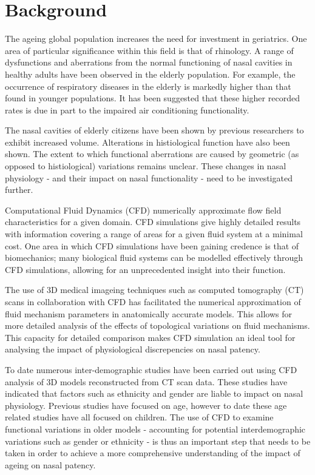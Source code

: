 \section{Background}

The ageing global population increases the need for investment in geriatrics. One area of particular significance within this field is that of rhinology. A range of dysfunctions and aberrations from the normal functioning of nasal cavities in healthy adults have been observed in the elderly population\cite{Edelstein1996, Lindemann2008}. For example, the occurrence of respiratory diseases in the elderly is markedly higher than that found in younger populations\cite{HO2001, Edelstein1996}. It has been suggested that these higher recorded rates is due in part to the impaired air conditioning functionality\cite{Lindemann2008}.


The nasal cavities of elderly citizens have been shown by previous researchers to exhibit increased volume\cite{Kalmovich2005}. Alterations in histiological function have also been shown\cite{HO2001}. The extent to which functional aberrations are caused by geometric (as opposed to histiological) variations remains unclear\cite{Varga-Huettner2013}. These changes in nasal physiology - and their impact on nasal functionality - need to be investigated further.


Computational Fluid Dynamics (CFD) numerically approximate flow field characteristics for a given domain. CFD  simulations give highly detailed results with information covering a range of areas for a given fluid system at a minimal cost. One area in which CFD simulations have been gaining credence is that of biomechanics; many biological fluid systems can be modelled effectively through CFD simulations, allowing for an unprecedented insight into their function.

The use of 3D medical imageing techniques such as computed tomography (CT) scans in collaboration with CFD has facilitated the numerical approximation of fluid mechanism parameters in anatomically accurate models. This allows for more detailed analysis of the effects of topological variations on fluid mechanisms. This capacity for detailed comparison makes CFD simulation an ideal tool for analysing the impact of physiological discrepencies on nasal patency.


To date numerous inter-demographic studies have been carried out using CFD analysis of 3D models reconstructed from CT scan data\cite{Xi2012, Garcia2007, Zhu2011}. These studies have indicated that factors such as ethnicity and gender are liable to impact on nasal physiology. Previous studies have focused on age\cite{Xi2012}, however to date these age related studies have all focused on children. The use of CFD to examine functional variations in older models - accounting for potential interdemographic variations such as gender or ethnicity - is thus an important step that needs to be taken in order to achieve a more comprehensive understanding of the impact of ageing on nasal patency.


